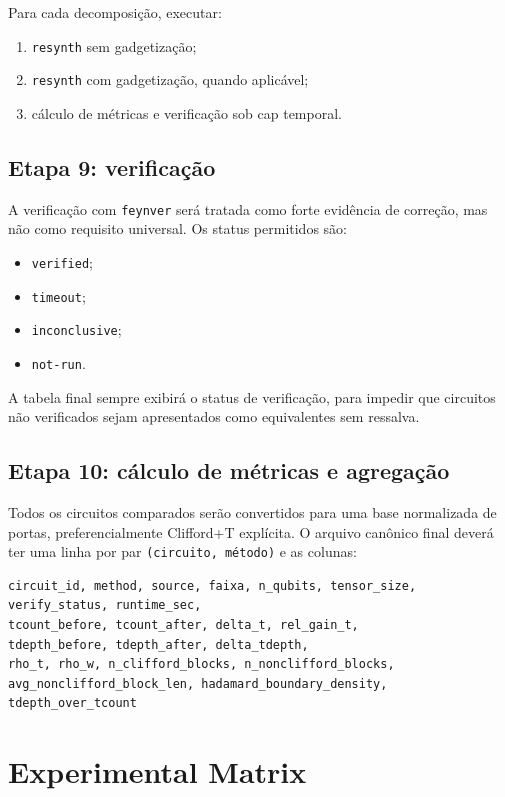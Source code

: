 \documentclass[a4paper,11pt]{article}
\begin{document}
Para cada decomposição, executar:
\begin{enumerate}
  \item \texttt{resynth} sem gadgetização;
  \item \texttt{resynth} com gadgetização, quando aplicável;
  \item cálculo de métricas e verificação sob cap temporal.
\end{enumerate}

\subsection*{Etapa 9: verificação}

A verificação com \texttt{feynver} será tratada como forte evidência de correção, mas não como requisito universal. Os status permitidos são:
\begin{itemize}
  \item \texttt{verified};
  \item \texttt{timeout};
  \item \texttt{inconclusive};
  \item \texttt{not-run}.
\end{itemize}

A tabela final sempre exibirá o status de verificação, para impedir que circuitos não verificados sejam apresentados como equivalentes sem ressalva.

\subsection*{Etapa 10: cálculo de métricas e agregação}

Todos os circuitos comparados serão convertidos para uma base normalizada de portas, preferencialmente Clifford+T explícita. O arquivo canônico final deverá ter uma linha por par \texttt{(circuito, método)} e as colunas:
\begin{verbatim}
circuit_id, method, source, faixa, n_qubits, tensor_size,
verify_status, runtime_sec,
tcount_before, tcount_after, delta_t, rel_gain_t,
tdepth_before, tdepth_after, delta_tdepth,
rho_t, rho_w, n_clifford_blocks, n_nonclifford_blocks,
avg_nonclifford_block_len, hadamard_boundary_density,
tdepth_over_tcount
\end{verbatim}

\section{Experimental Matrix}
\end{document}
